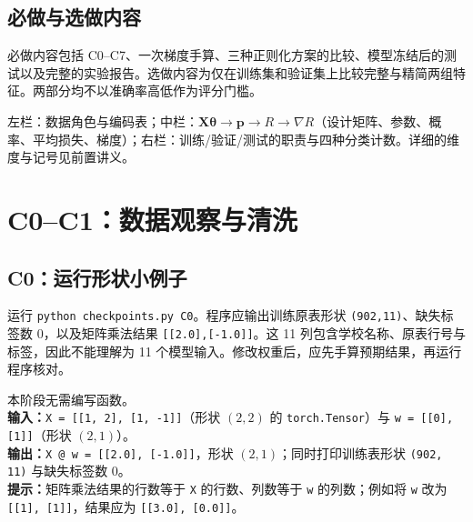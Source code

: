 \documentclass[UTF8,a4paper,11pt,fontset=fandol]{ctexart}
\begin{document}
\subsection{必做与选做内容}
必做内容包括 C0--C7、一次梯度手算、三种正则化方案的比较、模型冻结后的测试以及完整的实验报告。选做内容为仅在训练集和验证集上比较完整与精简两组特征。两部分均不以准确率高低作为评分门槛。
\begin{teacherbox}[板书安排]
左栏：数据角色与编码表；中栏：$\mathbf X\boldsymbol\theta\to\mathbf p\to R\to\nabla R$（设计矩阵、参数、概率、平均损失、梯度）；右栏：训练/验证/测试的职责与四种分类计数。详细的维度与记号见前置讲义。
\end{teacherbox}
\clearpage
\section{C0--C1：数据观察与清洗}
\subsection{C0：运行形状小例子}
运行 \texttt{python checkpoints.py C0}。程序应输出训练原表形状 \texttt{(902,11)}、缺失标签数 0，以及矩阵乘法结果 \texttt{[[2.0],[-1.0]]}。这 11 列包含学校名称、原表行号与标签，因此不能理解为 11 个模型输入。修改权重后，应先手算预期结果，再运行程序核对。
\begin{specbox}[C0 输入、输出与提示]
本阶段无需编写函数。\\
\textbf{输入：}\texttt{X = [[1, 2], [1, -1]]}（形状 $(2,2)$ 的 \texttt{torch.Tensor}）与 \texttt{w = [[0], [1]]}（形状 $(2,1)$）。\\
\textbf{输出：}\texttt{X @ w = [[2.0], [-1.0]]}，形状 $(2,1)$；同时打印训练表形状 \texttt{(902, 11)} 与缺失标签数 0。\\
\textbf{提示：}矩阵乘法结果的行数等于 \texttt{X} 的行数、列数等于 \texttt{w} 的列数；例如将 \texttt{w} 改为 \texttt{[[1], [1]]}，结果应为 \texttt{[[3.0], [0.0]]}。
\end{specbox}
\end{document}
